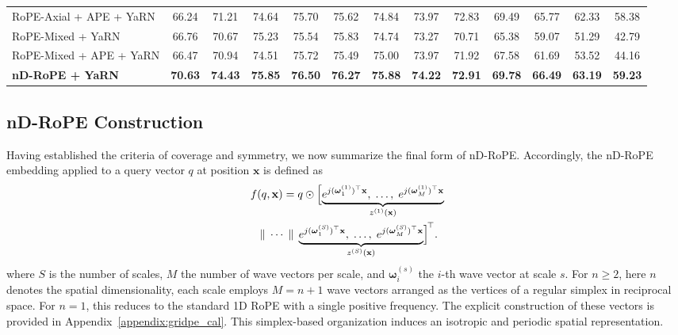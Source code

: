 \documentclass{article}
\theoremstyle{plain}
\theoremstyle{definition}
\theoremstyle{remark}
\begin{document}
\begin{table}[t]
{\begin{tabular}{lcccccccccccc}
RoPE-Axial + APE + YaRN
& 66.24 & 71.21 & 74.64 & 75.70 & 75.62 & 74.84 & 73.97 & 72.83 & 69.49 & 65.77 & 62.33 & 58.38 \\

RoPE-Mixed + YaRN
& 66.76 & 70.67 & 75.23 & 75.54 & 75.83 & 74.74 & 73.27 & 70.71 & 65.38 & 59.07 & 51.29 & 42.79 \\

RoPE-Mixed + APE + YaRN
& 66.47 & 70.94 & 74.51 & 75.72 & 75.49 & 75.00 & 73.97 & 71.92 & 67.58 & 61.69 & 53.52 & 44.16 \\

\textbf{nD-RoPE + YaRN}
& \textbf{70.63}
& \textbf{74.43}
& \textbf{75.85}
& \textbf{76.50}
& \textbf{76.27}
& \textbf{75.88}
& \textbf{74.22}
& \textbf{72.91}
& \textbf{69.78}
& \textbf{66.49}
& \textbf{63.19}
& \textbf{59.23} \\

\bottomrule
\end{tabular}
}
\end{table}

\subsection{nD-RoPE Construction}
Having established the criteria of coverage and symmetry, we now summarize the final form of nD-RoPE. Accordingly, the nD-RoPE embedding applied to a query vector $q$ at position $\mathbf{x}$ is defined as
\begin{multline}\label{eq:z_multiscale_row}
f(q,\mathbf{x}) = q \odot
\Bigl[
  \underbrace{
    e^{j (\boldsymbol{\omega}^{(1)}_1)^\top \mathbf{x}},\; \dots,\;
    e^{j (\boldsymbol{\omega}^{(1)}_{M})^\top \mathbf{x}}
  }_{z^{(1)}(\mathbf{x})}
\\
  \;\Vert\; \cdots \;\Vert\;
  \underbrace{
    e^{j (\boldsymbol{\omega}^{(S)}_1)^\top \mathbf{x}},\; \dots,\;
    e^{j (\boldsymbol{\omega}^{(S)}_{M})^\top \mathbf{x}}
  }_{z^{(S)}(\mathbf{x})}
\Bigr]^{\!\top}.
\end{multline}
where $S$ is the number of scales, $M$ the number of wave vectors per scale, and $\boldsymbol{\omega}^{(s)}_i$ the $i$-th wave vector at scale $s$. For $n \ge 2$, here $n$ denotes the spatial dimensionality, each scale employs $M=n+1$ wave vectors arranged as the vertices of a regular simplex in reciprocal space. For $n=1$, this reduces to the standard 1D RoPE with a single positive frequency. The explicit construction of these vectors is provided in Appendix~\ref{appendix:gridpe_cal}. This simplex-based organization induces an isotropic and periodic spatial representation. 
\end{document}
